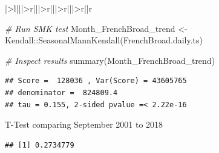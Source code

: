 \documentclass[
  12pt,
]{article}
\newenvironment{Shaded}{\begin{snugshade}}{\end{snugshade}}
\newcommand{\CommentTok}[1]{\textcolor[rgb]{0.56,0.35,0.01}{\textit{#1}}}
\newcommand{\DecValTok}[1]{\textcolor[rgb]{0.00,0.00,0.81}{#1}}
\newcommand{\DocumentationTok}[1]{\textcolor[rgb]{0.56,0.35,0.01}{\textbf{\textit{#1}}}}
\newcommand{\FunctionTok}[1]{\textcolor[rgb]{0.00,0.00,0.00}{#1}}
\newcommand{\NormalTok}[1]{#1}
\newcommand{\OtherTok}[1]{\textcolor[rgb]{0.56,0.35,0.01}{#1}}
\newcommand{\SpecialCharTok}[1]{\textcolor[rgb]{0.00,0.00,0.00}{#1}}
\begin{document}
\begin{table}
\begin{tabular}[t]{|>{}l|||>{}r|||>{}r|||>{}r|||>{}r||r}
\begin{Shaded}
\begin{Highlighting}[]
\CommentTok{\# Run SMK test}
\NormalTok{Month\_FrenchBroad\_trend }\OtherTok{\textless{}{-}}\NormalTok{ Kendall}\SpecialCharTok{::}\FunctionTok{SeasonalMannKendall}\NormalTok{(FrenchBroad.daily.ts)}

\CommentTok{\# Inspect results}
\FunctionTok{summary}\NormalTok{(Month\_FrenchBroad\_trend)}
\end{Highlighting}
\end{Shaded}

\begin{verbatim}
## Score =  128036 , Var(Score) = 43605765
## denominator =  824809.4
## tau = 0.155, 2-sided pvalue =< 2.22e-16
\end{verbatim}

T-Test comparing September 2001 to 2018

\begin{Shaded}
\end{Shaded}

\begin{verbatim}
## [1] 0.2734779
\end{verbatim}

\begin{Shaded}
\end{Shaded}


\end{tabular}
\end{table}
\end{document}
